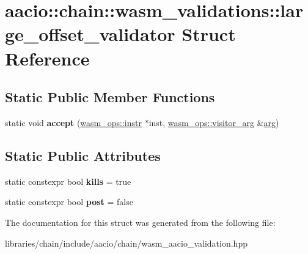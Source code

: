 \hypertarget{structaacio_1_1chain_1_1wasm__validations_1_1large__offset__validator}{}\section{aacio\+:\+:chain\+:\+:wasm\+\_\+validations\+:\+:large\+\_\+offset\+\_\+validator Struct Reference}
\label{structaacio_1_1chain_1_1wasm__validations_1_1large__offset__validator}
\subsection*{Static Public Member Functions}
\begin{DoxyCompactItemize}
\item 
\mbox{\label{structaacio_1_1chain_1_1wasm__validations_1_1large__offset__validator_aed93a5ac76f751b0b66a936fc38795e0}} 
static void {\bfseries accept} (\mbox{\hyperlink{structaacio_1_1chain_1_1wasm__ops_1_1instr}{wasm\+\_\+ops\+::instr}} $\ast$inst, \mbox{\hyperlink{structaacio_1_1chain_1_1wasm__ops_1_1visitor__arg}{wasm\+\_\+ops\+::visitor\+\_\+arg}} \&\mbox{\hyperlink{unionarg}{arg}})
\end{DoxyCompactItemize}
\subsection*{Static Public Attributes}
\begin{DoxyCompactItemize}
\item 
\mbox{\label{structaacio_1_1chain_1_1wasm__validations_1_1large__offset__validator_a53786675e1c57e09156e00fd2a52934a}} 
static constexpr bool {\bfseries kills} = true
\item 
\mbox{\label{structaacio_1_1chain_1_1wasm__validations_1_1large__offset__validator_a859de6ee5057e964411a970ac2b03d44}} 
static constexpr bool {\bfseries post} = false
\end{DoxyCompactItemize}


The documentation for this struct was generated from the following file\+:\begin{DoxyCompactItemize}
\item 
libraries/chain/include/aacio/chain/wasm\+\_\+aacio\+\_\+validation.\+hpp\end{DoxyCompactItemize}
